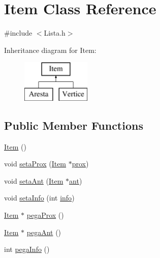 \hypertarget{class_item}{\section{Item Class Reference}
\label{class_item}
}


{\ttfamily \#include $<$Lista.\-h$>$}

Inheritance diagram for Item\-:\begin{figure}[H]
\begin{center}
\leavevmode
\includegraphics[height=2.000000cm]{class_item}
\end{center}
\end{figure}
\subsection*{Public Member Functions}
\begin{DoxyCompactItemize}
\item 
\hyperlink{class_item_a297720c02984eab37332ae795d22189d}{Item} ()
\item 
void \hyperlink{class_item_aeea06d242803e4fedbbe98cc36f5b6d9}{seta\-Prox} (\hyperlink{class_item}{Item} $\ast$\hyperlink{class_item_aa80cddac5a6f4213726fbf01045cf604}{prox})
\item 
void \hyperlink{class_item_a7e8bf0cd525f073018792deb778cf5d2}{seta\-Ant} (\hyperlink{class_item}{Item} $\ast$\hyperlink{class_item_aac7756495b3c31f38745064f17088dd1}{ant})
\item 
void \hyperlink{class_item_a162ade7dabf9bc6f3bd7909cde0620cc}{seta\-Info} (int \hyperlink{class_item_aa9042dad3a101d42bb82c9073dc01915}{info})
\item 
\hyperlink{class_item}{Item} $\ast$ \hyperlink{class_item_a06100877bf190da9ebdbe4ef9fec7718}{pega\-Prox} ()
\item 
\hyperlink{class_item}{Item} $\ast$ \hyperlink{class_item_a07a1d22091bc2e65e5db0482e3797dae}{pega\-Ant} ()
\item 
int \hyperlink{class_item_a42ae965c0740df01e65af042364f1582}{pega\-Info} ()
\end{DoxyCompactItemize}
